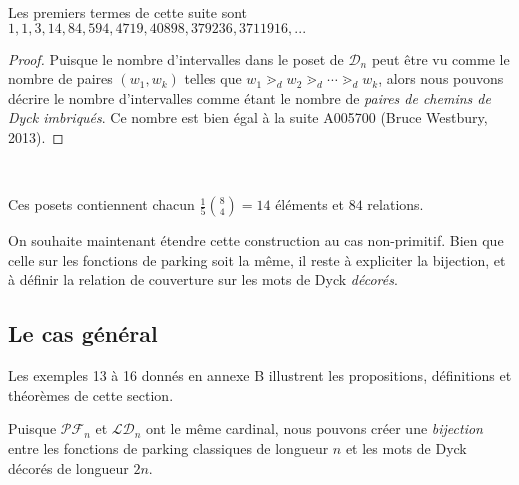 Les premiers termes de cette suite sont $1, 1, 3, 14, 84,
594, 4719, 40898, 379236, 3711916, ...$\\

\begin{proof}
    Puisque le nombre d'intervalles dans le poset de $\mathcal{D}_n$
    peut être vu comme le nombre de paires $(w_1, w_k)$ telles que
    $w_1 \gtrdot_d w_2 \gtrdot_d \cdots \gtrdot_d w_k$, alors nous pouvons
    décrire le nombre d'intervalles comme étant le nombre de 
    \emph{paires de chemins de Dyck imbriqués}.
    Ce nombre est bien égal à la suite A005700 (Bruce Westbury, 2013).
\end{proof}

\begin{expl}
    ~\\
    \begin{center}
        
        Ces posets contiennent chacun $\frac {1}{5} \binom{8}{4} =
        14$ éléments et $84$ relations.
    \end{center}
\end{expl}

On souhaite maintenant étendre cette construction au cas non-primitif.
Bien que celle sur les fonctions de parking soit la même, il
reste à expliciter la bijection, et à définir la relation de couverture
sur les mots de Dyck \emph{décorés}.

\subsection{Le cas général}

Les exemples 13 à 16 donnés en annexe B illustrent les propositions,
définitions et théorèmes de cette section.

\begin{prop}
    Puisque $\mathcal{PF}_n$ et $\mathcal{LD}_n$ ont le même cardinal,
    nous pouvons créer une \emph{bijection} entre les fonctions de parking
    classiques de longueur $n$ et les mots de Dyck décorés de
    longueur $2n$.
\end{prop}

